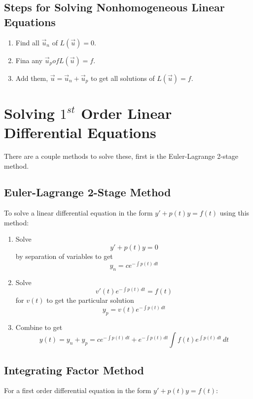     \subsection{Steps for Solving Nonhomogeneous Linear Equations}
    \begin{enumerate}
    \item Find all $\vec{u}_n$ of $L(\vec{u}) = 0$.
    \item Fina any $\vec{u}_p of L(\vec{u}) = f$.
    \item Add them, $\vec{u} = \vec{u}_n + \vec{u}_p$ to get all solutions of $L(\vec{u}) = f$.
    \end{enumerate}

\section{Solving $1^{st}$ Order Linear Differential Equations}

There are a couple methods to solve these, first is the Euler-Lagrange 2-stage method.

    \subsection{Euler-Lagrange 2-Stage Method}

    To solve a linear differential equation in the form $y\prime + p(t) y = f(t)$ using this method:

    \begin{enumerate}
    \item Solve
        \[
        y\prime + p(t)y = 0
        \]
        by separation of variables to get 
        \[
        y_n = c e^{-\int p(t)\, dt}
        \]
    \item Solve
        \[
        v\prime(t) e^{-\int p(t)\, dt} = f(t)
        \]
        for $v(t)$ to get the particular solution
        \[
        y_p = v(t) e^{-\int p(t)\, dt}
        \]
    \item Combine to get
        \begin{equation}\label{eq:el2sm}
        y(t) = y_n + y_p = c e^{-\int p(t)\, dt} + e^{-\int p(t)\, dt} \int f(t) e^{\int p(t)\, dt} \, dt
        \end{equation}
    \end{enumerate}

    \subsection{Integrating Factor Method}
    For a first order differential equation in the form $y\prime + p(t)y = f(t)$:

